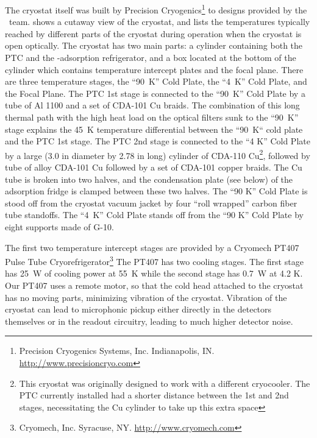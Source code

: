 The cryostat itself was built by Precision Cryogenics\footnote{Precision Cryogenics Systems, Inc. Indianapolis, IN. \url{http://www.precisioncryo.com}} to designs provided by the \Imager\ team.
 shows a cutaway view of the cryostat, and  lists the temperatures typically reached by different parts of the cryostat during operation when the cryostat is open optically.
The cryostat has two main parts: a cylinder containing both the PTC and the -adsorption refrigerator, and a box located at the bottom of the cylinder which contains temperature intercept plates and the focal plane.
There are three temperature stages, the ``90~K'' Cold Plate, the ``4~K'' Cold Plate, and the Focal Plane.
The PTC 1st stage is connected to the ``90~K'' Cold Plate by a tube of Al 1100 and a set of CDA-101 Cu braids.
The combination of this long thermal path with the high heat load on the optical filters sunk to the ``90~K'' stage explains the 45~K temperature differential between the ``90~K`` cold plate and the PTC 1st stage.
The PTC 2nd stage is connected to the ``4 K'' Cold Plate by a large (3.0 in diameter by 2.78 in long) cylinder of CDA-110 Cu\footnote{This cryostat was originally designed to work with a different cryocooler. The PTC currently installed had a shorter distance between the 1st and 2nd stages, necessitating the Cu cylinder to take up this extra space}, followed by tube of alloy CDA-101 Cu followed by a set of  CDA-101 copper braids.
The Cu tube is broken into two halves, and the condensation plate (see below) of the adsorption fridge is clamped between these two halves. The ``90 K'' Cold Plate is stood off from the cryostat vacuum jacket by four ``roll wrapped'' carbon fiber tube standoffs. The ``4~K'' Cold Plate stands off from the ``90 K'' Cold Plate by eight supports made of G-10.

The first two temperature intercept stages are provided by a Cryomech PT407 Pulse Tube Cryorefrigerator\footnote{Cryomech, Inc. Syracuse, NY. \url{http://www.cryomech.com}}
The PT407 has two cooling stages.
The first stage has 25~W of cooling power at 55~K while the second stage has 0.7~W at 4.2 K.
Our PT407 uses a remote motor, so that the cold head attached to the cryostat has no moving parts, minimizing vibration of the cryostat.
Vibration of the cryostat can lead to microphonic pickup either directly in the detectors themselves or in the readout circuitry, leading to much higher detector noise.


